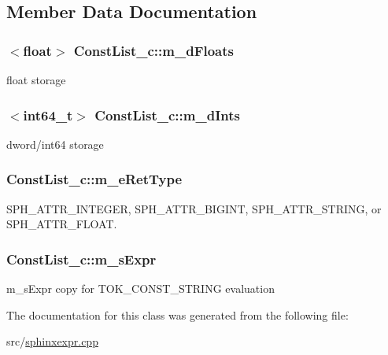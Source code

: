 \subsection{Member Data Documentation}
\hypertarget{classConstList__c_a6e8e9934d2e75fe650aced5c5f33f453}{
\subsubsection[{m\-\_\-d\-Floats}]{$<${\bf float}$>$ Const\-List\-\_\-c\-::m\-\_\-d\-Floats}}\label{classConstList__c_a6e8e9934d2e75fe650aced5c5f33f453}


float storage 

\hypertarget{classConstList__c_a607e78bece916b50e58b7a1eb9f6e65a}{
\subsubsection[{m\-\_\-d\-Ints}]{$<${\bf int64\-\_\-t}$>$ Const\-List\-\_\-c\-::m\-\_\-d\-Ints}}\label{classConstList__c_a607e78bece916b50e58b7a1eb9f6e65a}


dword/int64 storage 

\hypertarget{classConstList__c_a71168a3a2e84bd34d9f49acf9ad320aa}{
\subsubsection[{m\-\_\-e\-Ret\-Type}]{ Const\-List\-\_\-c\-::m\-\_\-e\-Ret\-Type}}\label{classConstList__c_a71168a3a2e84bd34d9f49acf9ad320aa}


S\-P\-H\-\_\-\-A\-T\-T\-R\-\_\-\-I\-N\-T\-E\-G\-E\-R, S\-P\-H\-\_\-\-A\-T\-T\-R\-\_\-\-B\-I\-G\-I\-N\-T, S\-P\-H\-\_\-\-A\-T\-T\-R\-\_\-\-S\-T\-R\-I\-N\-G, or S\-P\-H\-\_\-\-A\-T\-T\-R\-\_\-\-F\-L\-O\-A\-T. 

\hypertarget{classConstList__c_a44386b345080954be5a2fad2c4d6ba6c}{
\subsubsection[{m\-\_\-s\-Expr}]{ Const\-List\-\_\-c\-::m\-\_\-s\-Expr}}\label{classConstList__c_a44386b345080954be5a2fad2c4d6ba6c}


m\-\_\-s\-Expr copy for T\-O\-K\-\_\-\-C\-O\-N\-S\-T\-\_\-\-S\-T\-R\-I\-N\-G evaluation 



The documentation for this class was generated from the following file\-:\begin{DoxyCompactItemize}
\item 
src/\hyperlink{sphinxexpr_8cpp}{sphinxexpr.\-cpp}\end{DoxyCompactItemize}
